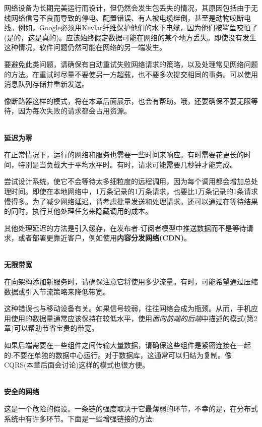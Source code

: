 网络设备为长期完美运行而设计，但仍然会发生包丢失的情况，其原因包括由于无线网络信号不良而导致的停电、配置错误、有人被电缆绊倒，甚至是动物咬断电线。例如，Google必须用Kevlar纤维保护他们的水下电缆，因为他们被鲨鱼咬怕了(是的，这是真的)。应该始终假定数据可能在网络的某个地方丢失。即使没有发生这种情况，软件问题仍然可能在网络的另一端发生。

要避免此类问题，请确保有自动重试失败网络请求的策略，以及处理常见网络问题的方法。在重试时尽量不要使另一方超载，也不要多次提交相同的事务。可以使用消息队列存储并重新发送。

像断路器这样的模式，将在本章后面展示，也会有帮助。哦，还要确保不要无限等待，因为每次失败的请求都会占用资源。

\hspace*{\fill} \\ %
\noindent
\textbf{延迟为零}

在正常情况下，运行的网络和服务也需要一些时间来响应。有时需要花更长的时间，特别是当负载大于平均水平时。有时，请求可能需要几秒钟才能完成。

尝试设计系统，使它不会等待太多细粒度的远程调用，因为每个调用都会增加总处理时间。即使在本地网络中，1万条记录的1万条请求，也要比1万条记录的1条请求慢得多。为了减少网络延迟，请考虑批量发送和处理请求。还可以通过在等待结果的同时，执行其他处理任务来隐藏调用的成本。

其他处理延迟的方法是引入缓存，在发布者-订阅者模型中推送数据而不是等待请求，或者部署更靠近客户，例如使用\textbf{内容分发网络(CDN)}。

\hspace*{\fill} \\ %
\noindent
\textbf{无限带宽}

在向架构添加新服务时，请确保注意它将使用多少流量。有时，可能希望通过压缩数据或引入节流策略来降低带宽。

这种错误也与移动设备有关。如果信号较弱，往往网络会成为瓶颈。从而，手机应用使用的数据量通常应该保持在较低水平，使用\textit{面向前端的后端}中描述的模式(第2章)可以帮助节省宝贵的带宽。

如果后端需要在一些组件之间传输大量数据，请确保这些组件是紧密连接在一起的:不要在单独的数据中心运行。对于数据库，这通常可以归结为复制。像CQRS(本章后面会讨论)这样的模式也很方便。

\hspace*{\fill} \\ %
\noindent
\textbf{安全的网络}

这是一个危险的假设。一条链的强度取决于它最薄弱的环节，不幸的是，在分布式系统中有许多环节。下面是一些增强链接的方法:

